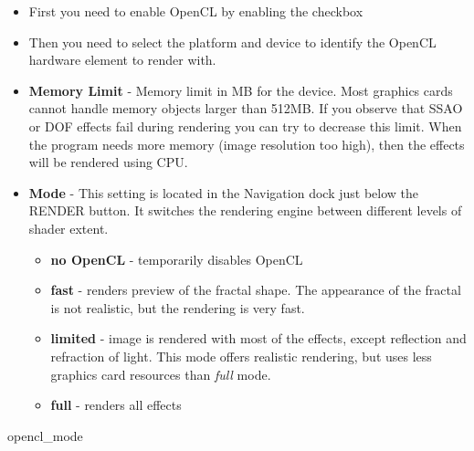 \begin{itemize}
	\item First you need to enable OpenCL by enabling the checkbox
	\item Then you need to select the platform and device to identify the OpenCL hardware 
		element to render with.
	\item \textbf{Memory Limit} - Memory limit in MB for the device. Most graphics cards cannot handle memory objects larger than 512MB. If you observe that SSAO or DOF effects fail during rendering you can try to decrease this limit. When the program needs more memory (image resolution too high), then the effects will be rendered using CPU.
	\item \textbf{Mode} - This setting is located in the Navigation dock just below the RENDER button. It switches the rendering engine between different levels of shader extent.
	\begin{itemize}
		\item  \textbf{no OpenCL} - temporarily disables OpenCL 
		\item  \textbf{fast} - renders preview of the fractal shape. The appearance of the fractal is not realistic, but the rendering is very fast.
		\item  \textbf{limited} - image is rendered with most of the effects, except reflection and refraction of light. This mode offers realistic rendering, but uses less graphics card resources than \emph{full} mode. 
		\item  \textbf{full} - renders all effects
	\end{itemize}	

	
\end{itemize}
	{opencl_mode}


